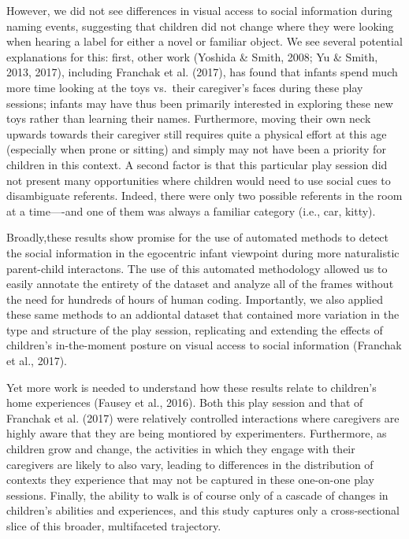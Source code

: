 \documentclass[english,man,floatsintext]{apa6}
\begin{document}
However, we did not see differences in visual access to social
information during naming events, suggesting that children did not
change where they were looking when hearing a label for either a novel
or familiar object. We see several potential explanations for this:
first, other work (Yoshida \& Smith, 2008; Yu \& Smith, 2013, 2017),
including Franchak et al. (2017), has found that infants spend much more
time looking at the toys vs.~their caregiver's faces during these play
sessions; infants may have thus been primarily interested in exploring
these new toys rather than learning their names. Furthermore, moving
their own neck upwards towards their caregiver still requires quite a
physical effort at this age (especially when prone or sitting) and
simply may not have been a priority for children in this context. A
second factor is that this particular play session did not present many
opportunities where children would need to use social cues to
disambiguate referents. Indeed, there were only two possible referents
in the room at a time----and one of them was always a familiar category
(i.e., car, kitty).

Broadly,these results show promise for the use of automated methods to
detect the social information in the egocentric infant viewpoint during
more naturalistic parent-child interactons. The use of this automated
methodology allowed us to easily annotate the entirety of the dataset
and analyze all of the frames without the need for hundreds of hours of
human coding. Importantly, we also applied these same methods to an
addiontal dataset that contained more variation in the type and
structure of the play session, replicating and extending the effects of
children's in-the-moment posture on visual access to social information
(Franchak et al., 2017).

Yet more work is needed to understand how these results relate to
children's home experiences (Fausey et al., 2016). Both this play
session and that of Franchak et al. (2017) were relatively controlled
interactions where caregivers are highly aware that they are being
montiored by experimenters. Furthermore, as children grow and change,
the activities in which they engage with their caregivers are likely to
also vary, leading to differences in the distribution of contexts they
experience that may not be captured in these one-on-one play sessions.
Finally, the ability to walk is of course only of a cascade of changes
in children's abilities and experiences, and this study captures only a
cross-sectional slice of this broader, multifaceted trajectory.
\end{document}
